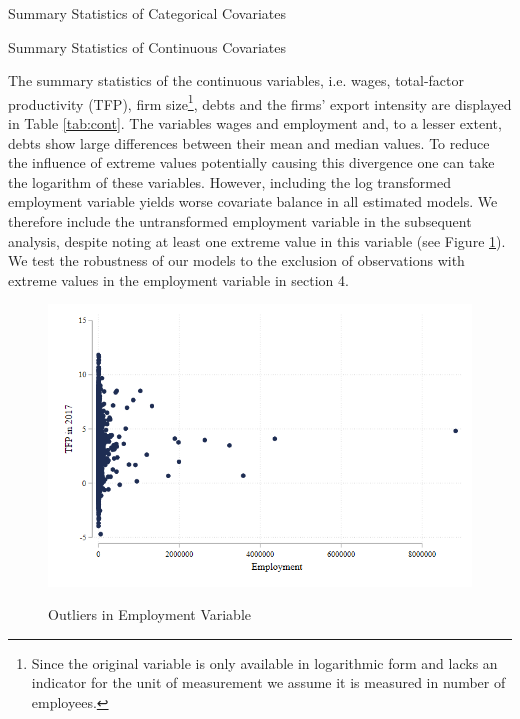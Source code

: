 \documentclass[a4paper,11pt]{scrartcl}
\begin{document}
\begin{table}[h!]
	\centering
	\caption{Summary Statistics of Categorical Covariates} 
	
	\label{tab:cat}	
\end{table} 

\setlength{\floatsep}{40pt plus 2.0pt}

\begin{table}[h!]
	\centering
	\caption{Summary Statistics of Continuous Covariates} 
	
	\label{tab:cont}
\end{table}



\clearpage

The summary statistics of the continuous variables, i.e. wages,  total-factor productivity (TFP), firm size\footnote{Since the original variable is only available in logarithmic form and lacks an indicator for the unit of measurement we assume it is measured in number of employees.}, debts and the firms' export intensity are displayed in Table \ref{tab:cont}. The variables wages and employment  and, to a lesser extent, debts show large differences between their mean and median values. To reduce the influence of extreme values potentially causing this divergence one can take the logarithm of these variables. However, including the log transformed employment variable yields worse covariate balance in all estimated models. We therefore include the untransformed employment variable in the subsequent analysis, despite noting at least one extreme value in this variable (see Figure \ref{fig:outliers}). We test the robustness of our models to the exclusion of observations with extreme values in the employment variable in section 4.


\begin{figure}[h!]\centering
	\caption{Outliers in Employment Variable}
	\includegraphics[width=\textwidth]{emp15_outliers}
  	\label{fig:outliers}
\end{figure} 
\newpage
\end{document}
